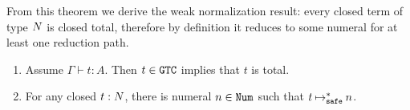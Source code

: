 From this theorem we derive the weak normalization result: 
every closed term of type ${N}$ is closed total, therefore by definition it reduces to some numeral for at least
one reduction path. 

\begin{corollary}\label{cor:WN_typeN}
  \begin {enumerate}
  \item
   Assume  $\Gamma\vdash t:A$. Then $t \in {\tt GTC}$ implies that $t$ is total.
  \item
    For any closed $t:{N}$, there is numeral $n\in{\tt Num}$ such that $t\mathbin{\mathbin{\mapsto}_{\hbox{\scriptsize \tt safe}}^*} n$. 
  \end{enumerate}
\end{corollary}


